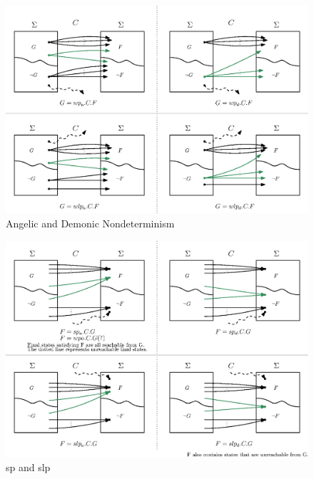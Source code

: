 \begin{figure}[ht!]\centering
\includegraphics[width=\textwidth]{image/wp-wlp-angelic-demonic.eps}
\caption{Angelic and Demonic Nondeterminism}
\label{fig:ang-dem}
\end{figure}


\begin{figure}[ht!]\centering
\includegraphics[width=\textwidth]{image/sp-slp.eps}
\caption{sp and slp}
\label{fig:sp-slp}
\end{figure}


